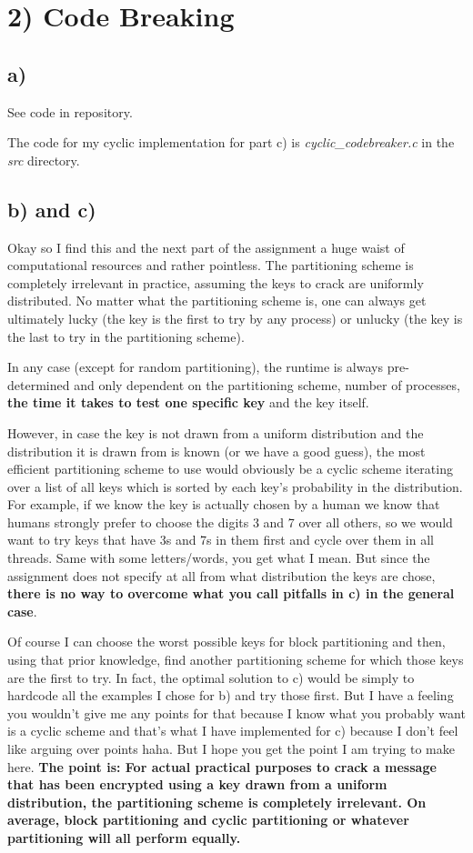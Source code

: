 \documentclass[a4paper, 11pt]{article}
\begin{document}
\section*{2) Code Breaking}
\subsection*{a)}
See code in repository. 

The code for my cyclic implementation for part c) is
\textit{cyclic\_codebreaker.c} in the \textit{src} directory.

\subsection*{b) and c)}
Okay so I find this and the next part of the assignment a huge waist of
computational resources and rather pointless. The partitioning scheme is
completely irrelevant in practice, assuming the keys to crack are uniformly
distributed. No matter what the partitioning scheme is, one can always get
ultimately lucky (the key is the first to try by any process) or unlucky (the
key is the last to try in the partitioning scheme). 

In any case (except for random partitioning), the runtime is always
pre-determined and only dependent on the partitioning scheme, number of
processes, \textbf{the time it takes to test one specific key} and the key
itself.

However, in case the key is not drawn from a uniform distribution and the
distribution it is drawn from is known (or we have a good guess), the most
efficient partitioning scheme to use would obviously be a cyclic scheme
iterating over a list of all keys which is sorted by each key's probability in
the distribution. For example, if we know the key is actually chosen by a human
we know that humans strongly prefer to choose the digits 3 and 7 over all
others, so we would want to try keys that have 3s and 7s in them first and
cycle over them in all threads. Same with some letters/words, you get what I
mean. But since the assignment does not specify at all from what distribution
the keys are chose, \textbf{there is no way to overcome what you call pitfalls
in c) in the general case}.

Of course I can choose the worst possible keys for block partitioning and then,
using that prior knowledge, find another partitioning scheme for which those
keys are the first to try. In fact, the optimal solution to c) would be
simply to hardcode all the examples I chose for b) and try those first. But I
have a feeling you wouldn't give me any points for that because I know what you
probably want is a cyclic scheme and that's what I have implemented for c)
because I don't feel like arguing over points haha. But I hope you get the
point I am trying to make here. \textbf{The point is: For actual practical
  purposes to crack a message that has been encrypted using a key drawn from a
  uniform distribution, the partitioning scheme is completely irrelevant. On
average, block partitioning and cyclic partitioning or whatever partitioning
will all perform equally.}
\end{document}
